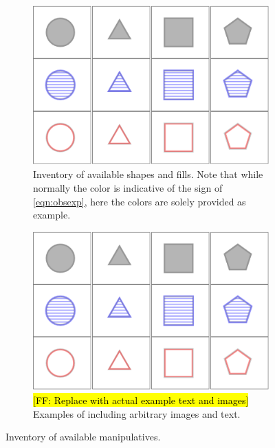 \documentclass[11pt,letterpaper]{article}
\newcommand{\Note}[1]{}
\renewcommand{\Note}[1]{\hl{[#1]}}
\newcommand{\NoteSigned}[3]{{\sethlcolor{#2}\Note{#1: #3}}}
\newcommand{\NoteFF}[1]{\NoteSigned{FF}{LightBlue}{#1}}
\begin{document}
\begin{figure}[t]
\begin{center}
\begin{subfigure}[b]{\columnwidth}
\centering
\includegraphics[scale=.5]{images/different_shapes_fills3x4.PNG}
\caption{Inventory of available shapes and fills. Note that while normally the color is indicative of the sign of \eqref{eqn:obsexp}, here the colors are solely provided as example.}
\label{fig:shape_inventory}
\end{subfigure}

\vspace{1em}
\begin{subfigure}[b]{\columnwidth}
\centering
\includegraphics[scale=.5]{images/different_shapes_fills3x4.PNG}
\caption{\NoteFF{Replace with actual example text and images} Examples of including arbitrary images and text.}
\label{fig:imgtxt_inventory}
\end{subfigure}
\caption{Inventory of available manipulatives.}
\label{fig:inventory}
\end{center}
\end{figure}
\end{document}
